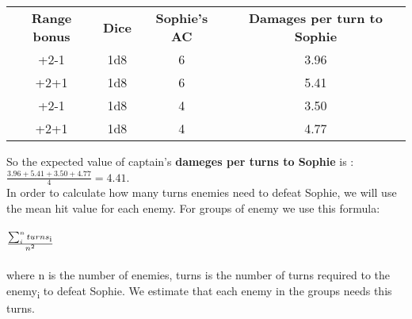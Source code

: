 \begin{table}[H]
  \centering
  \begin{tabular}{|c|c|c|c|}
    \hline
    \rowcolor[HTML]{9B9B9B}
    \multicolumn{4}{|c|}{\cellcolor[HTML]{9B9B9B}{\color[HTML]{FFFFFF} \textbf{Captain}}} \\ \hline
    \rowcolor[HTML]{C0C0C0}
    \textbf{Range bonus} & \textbf{Dice} & \textbf{Sophie's AC} & \textbf{Damages per turn to Sophie} \\ \hline
    +2-1 & 1d8 & 6 & 3.96 \\ \hline
    +2+1 & 1d8 & 6 & 5.41 \\ \hline
    +2-1 & 1d8 & 4 & 3.50 \\ \hline
    +2+1 & 1d8 & 4 & 4.77 \\ \hline
  \end{tabular}
\end{table}
So the expected value of captain's \textbf{dameges per turns to Sophie} is :\\
$\frac{3.96+5.41+3.50+4.77}{4}=4.41$.\\
In order to calculate how many turns enemies need to defeat Sophie, we will use the mean hit value for each enemy. For groups of enemy we use this formula:\\\\
$\frac{\sum_{i}^{n}turns\textsubscript{i}}{n^2}$\\\\
where n is the number of enemies, turns is the number of turns required to the enemy\textsubscript{i} to defeat Sophie. We estimate that each enemy in the groups needs this turns.
\begin{table}[H]
\end{table}

